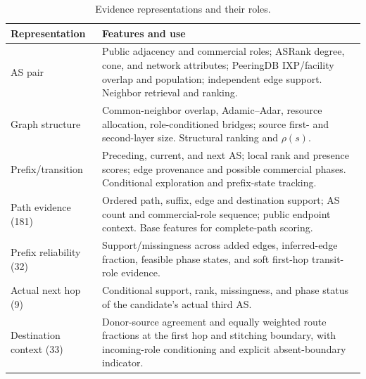 \begin{table}[t]
\centering
\caption{Evidence representations and their roles.}
\label{tab:method_features}
\footnotesize
\begin{tabularx}{\columnwidth}{@{}lX@{}}
\toprule
Representation & Features and use\\
\midrule
AS pair & Public adjacency and commercial roles; ASRank degree, cone,
and network attributes; PeeringDB IXP/facility overlap and population;
independent edge support. Neighbor retrieval and ranking.\\
Graph structure & Common-neighbor overlap, Adamic--Adar,
resource allocation, role-conditioned bridges; source first- and
second-layer size. Structural ranking and $\rho(s)$.\\
Prefix/transition & Preceding, current, and next AS; local rank and
presence scores; edge provenance and possible commercial phases.
Conditional exploration and prefix-state tracking.\\
Path evidence (181) & Ordered path, suffix, edge and destination
support; AS count and commercial-role sequence; public endpoint context.
Base features for complete-path scoring.\\
Prefix reliability (32) & Support/missingness across added edges,
inferred-edge fraction, feasible phase states, and soft first-hop
transit-role evidence.\\
Actual next hop (9) & Conditional support, rank, missingness, and
phase status of the candidate's actual third AS.\\
Destination context (33) & Donor-source agreement and equally weighted
route fractions at the first hop and stitching boundary, with incoming-role
conditioning and explicit absent-boundary indicator.\\
\bottomrule
\end{tabularx}
\end{table}
